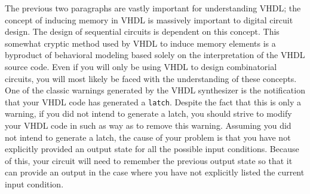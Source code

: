 The previous two paragraphs are vastly important for understanding VHDL; the concept of inducing memory in VHDL is massively important to digital circuit design. The design of sequential circuits is dependent on this concept. This somewhat cryptic method used by VHDL to induce memory elements is a byproduct of behavioral modeling based solely on the interpretation of the VHDL source code. Even if you will only be using VHDL to design combinatorial circuits, you will most likely be faced with the understanding of these concepts. One of the classic warnings generated by the VHDL synthesizer is the notification that your VHDL code has generated a \texttt{latch}. Despite the fact that this is only a warning, if you did not intend to generate a latch, you should strive to modify your VHDL code in such as way as to remove this warning. Assuming you did not intend to generate a latch, the cause of your problem is that you have not explicitly provided an output state for all the possible input conditions. Because of this, your circuit will need to remember the previous output state so that it can provide an output in the case where you have not explicitly listed the current input condition. 

